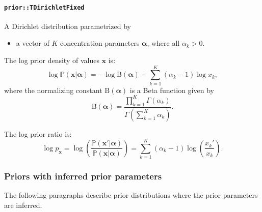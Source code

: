 \documentclass[a4paper,11pt]{article}
\def\x{\boldsymbol{x}}
\def\balpha{\boldsymbol{\alpha}}
\def\p{\mathbb{P}}
\newcommand{\class}[1]{\texttt{#1}}
\begin{document}
\paragraph{\class{prior::TDirichletFixed}}

A Dirichlet distribution parametrized by
\begin{itemize}
 \item a vector of $K$ concentration parameters $\balpha$, where all $\alpha_k > 0$.
\end{itemize}

The log prior density of values $\x$ is:
\begin{equation}\label{eq:logDensDirichlet}
 \log \p(\x|\balpha) = - \log \text{B}(\balpha) + \sum_{k=1}^K (\alpha_k - 1) \log x_k,
\end{equation}
where the normalizing constant $\text{B}(\balpha)$ is a Beta function given by
\begin{equation*}
 \text{B}(\balpha) = \frac{\prod_{k=1}^K \Gamma(\alpha_k)}{\Gamma(\sum_{k=1}^K \alpha_k)}.
\end{equation*}

The log prior ratio is:
\begin{equation}\label{eq:logRatioDirichlet}
 \log p_{\x} = \log \left( \frac{\p(\x'|\balpha)}{\p(\x|\balpha)} \right) = \sum_{k=1}^K \left( \alpha_k-1 \right) \log \left( \frac{x_k'}{x_k} \right).
\end{equation}

\subsubsection{Priors with inferred prior parameters}

The following paragraphs describe prior distributions where the prior parameters are inferred.
\end{document}
